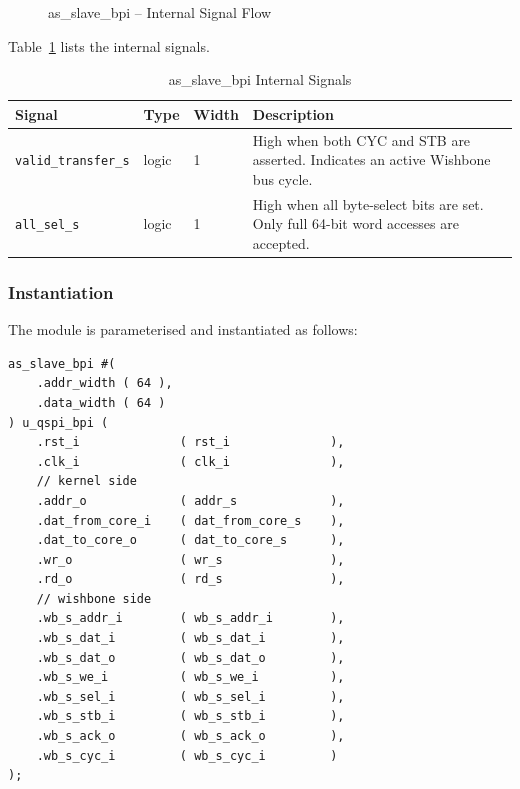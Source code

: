 \begin{figure}[H]
\caption{as\_slave\_bpi -- Internal Signal Flow}
\label{fig:asSlaveBpi01}
\end{figure}

Table~\ref{tab:asSlaveBpiInt} lists the internal signals.

\begin{table}[H]
\caption{as\_slave\_bpi Internal Signals}
\label{tab:asSlaveBpiInt}
\centering
\begin{tabularx}{\textwidth}{|l |l |l |X|}
  \hline
  Signal & Type & Width & Description \\
  \hline
  \hline
  \texttt{valid\_transfer\_s} & logic & 1 & High when both CYC and STB are asserted.
    Indicates an active Wishbone bus cycle. \\
  \hline
  \texttt{all\_sel\_s}        & logic & 1 & High when all byte-select bits are set.
    Only full 64-bit word accesses are accepted. \\
  \hline
\end{tabularx}
\end{table}

\subsubsection{Instantiation}

The module is parameterised and instantiated as follows:

\begin{verbatim}
as_slave_bpi #(
    .addr_width ( 64 ),
    .data_width ( 64 )
) u_qspi_bpi (
    .rst_i              ( rst_i              ),
    .clk_i              ( clk_i              ),
    // kernel side
    .addr_o             ( addr_s             ),
    .dat_from_core_i    ( dat_from_core_s    ),
    .dat_to_core_o      ( dat_to_core_s      ),
    .wr_o               ( wr_s               ),
    .rd_o               ( rd_s               ),
    // wishbone side
    .wb_s_addr_i        ( wb_s_addr_i        ),
    .wb_s_dat_i         ( wb_s_dat_i         ),
    .wb_s_dat_o         ( wb_s_dat_o         ),
    .wb_s_we_i          ( wb_s_we_i          ),
    .wb_s_sel_i         ( wb_s_sel_i         ),
    .wb_s_stb_i         ( wb_s_stb_i         ),
    .wb_s_ack_o         ( wb_s_ack_o         ),
    .wb_s_cyc_i         ( wb_s_cyc_i         )
);
\end{verbatim}

